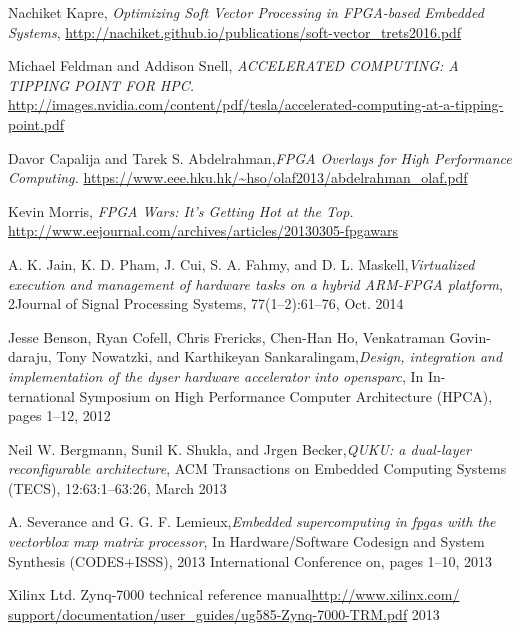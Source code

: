 
\begin{thebibliography}{1}
	
	Nachiket Kapre, \emph{Optimizing Soft Vector Processing in FPGA-based Embedded
		Systems}, \url{http://nachiket.github.io/publications/soft-vector_trets2016.pdf}
	
	
	
	Michael Feldman and Addison Snell, \emph{ACCELERATED COMPUTING: A TIPPING POINT FOR HPC.}
	\url{http://images.nvidia.com/content/pdf/tesla/accelerated-computing-at-a-tipping-point.pdf}
	
	Davor Capalija and Tarek S. Abdelrahman,\emph{FPGA Overlays for High Performance Computing.} \url{https://www.eee.hku.hk/~hso/olaf2013/abdelrahman_olaf.pdf}
	
	Kevin Morris, \emph{FPGA Wars: It’s Getting Hot at the Top.}
	\url{http://www.eejournal.com/archives/articles/20130305-fpgawars}
	
	A. K. Jain, K. D. Pham, J. Cui, S. A. Fahmy, and D. L. Maskell,\emph{Virtualized
		execution and management of hardware tasks on a hybrid ARM-FPGA platform}, 2Journal of Signal Processing Systems, 77(1–2):61–76, Oct. 2014
	
	Jesse Benson, Ryan Cofell, Chris Frericks, Chen-Han Ho, Venkatraman Govin-
	daraju, Tony Nowatzki, and Karthikeyan Sankaralingam,\emph{Design, integration
		and implementation of the dyser hardware accelerator into opensparc}, In In-
	ternational Symposium on High Performance Computer Architecture (HPCA),
	pages 1–12, 2012
	
	Neil W. Bergmann, Sunil K. Shukla, and Jrgen Becker,\emph{QUKU: a dual-layer
		reconfigurable architecture}, ACM Transactions on Embedded Computing Systems
	(TECS), 12:63:1–63:26, March 2013
	
	A. Severance and G. G. F. Lemieux,\emph{Embedded supercomputing in fpgas with the
		vectorblox mxp matrix processor}, In Hardware/Software Codesign and System
	Synthesis (CODES+ISSS), 2013 International Conference on, pages 1–10, 2013
	
	Xilinx Ltd. Zynq-7000 technical reference manual\url{http://www.xilinx.com/
		support/documentation/user_guides/ug585-Zynq-7000-TRM.pdf} 2013
	

\end{thebibliography}
